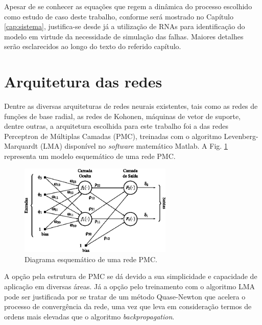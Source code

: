 Apesar de se conhecer as equações que regem a dinâmica do processo escolhido
como estudo de caso deste trabalho, conforme será mostrado no Capítulo
\ref{cap:sistema}, justifica-se desde já a utilização de RNAs para identificação
do modelo em virtude da necessidade de simulação das falhas. Maiores detalhes
serão esclarecidos ao longo do texto do referido capítulo.

\section{Arquitetura das redes}
Dentre as diversas arquiteturas de redes neurais existentes, tais como as redes
de funções de base radial, as redes de Kohonen, máquinas de vetor de suporte,
dentre outras, a arquitetura escolhida para este trabalho foi a das redes
Perceptron de Múltiplas Camadas (PMC), treinadas com o algoritmo
Levenberg-Marquardt (LMA) disponível no {\it software} matemático Matlab\reg. A
Fig. \ref{fig:pmc} representa um modelo esquemático de uma rede PMC.

\begin{figure}[htb]
\centering
    \includegraphics[width=0.65\textwidth]{imgs/rnas/eps/pmc}
    \caption{Diagrama esquemático de uma rede PMC.}
    \label{fig:pmc}
\end{figure}


A opção pela estrutura de PMC se dá devido a sua simplicidade e capacidade de
aplicação em diversas áreas. Já a opção pelo treinamento com o algoritmo LMA
pode ser justificada por se tratar de um método Quase-Newton que acelera o
processo de convergência da rede, uma vez que leva em consideração termos de
ordens mais elevadas que o algoritmo {\it backpropagation}. 

